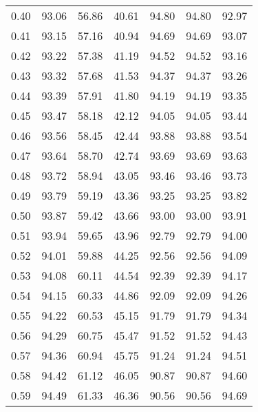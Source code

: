 \begin{tabular}{|c|c|c|c|c|c|c|}
      0.40 &     93.06 &     56.86 &      40.61 &   94.80 &      94.80 &         92.97 \\
      0.41 &     93.15 &     57.16 &      40.94 &   94.69 &      94.69 &         93.07 \\
      0.42 &     93.22 &     57.38 &      41.19 &   94.52 &      94.52 &         93.16 \\
      0.43 &     93.32 &     57.68 &      41.53 &   94.37 &      94.37 &         93.26 \\
      0.44 &     93.39 &     57.91 &      41.80 &   94.19 &      94.19 &         93.35 \\
      0.45 &     93.47 &     58.18 &      42.12 &   94.05 &      94.05 &         93.44 \\
      0.46 &     93.56 &     58.45 &      42.44 &   93.88 &      93.88 &         93.54 \\
      0.47 &     93.64 &     58.70 &      42.74 &   93.69 &      93.69 &         93.63 \\
      0.48 &     93.72 &     58.94 &      43.05 &   93.46 &      93.46 &         93.73 \\
      0.49 &     93.79 &     59.19 &      43.36 &   93.25 &      93.25 &         93.82 \\
      0.50 &     93.87 &     59.42 &      43.66 &   93.00 &      93.00 &         93.91 \\
      0.51 &     93.94 &     59.65 &      43.96 &   92.79 &      92.79 &         94.00 \\
      0.52 &     94.01 &     59.88 &      44.25 &   92.56 &      92.56 &         94.09 \\
      0.53 &     94.08 &     60.11 &      44.54 &   92.39 &      92.39 &         94.17 \\
      0.54 &     94.15 &     60.33 &      44.86 &   92.09 &      92.09 &         94.26 \\
      0.55 &     94.22 &     60.53 &      45.15 &   91.79 &      91.79 &         94.34 \\
      0.56 &     94.29 &     60.75 &      45.47 &   91.52 &      91.52 &         94.43 \\
      0.57 &     94.36 &     60.94 &      45.75 &   91.24 &      91.24 &         94.51 \\
      0.58 &     94.42 &     61.12 &      46.05 &   90.87 &      90.87 &         94.60 \\
      0.59 &     94.49 &     61.33 &      46.36 &   90.56 &      90.56 &         94.69 \\

\end{tabular}
